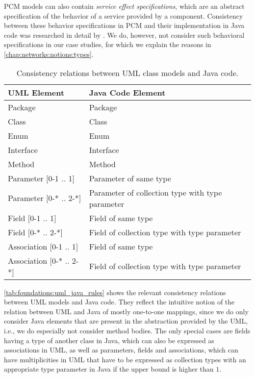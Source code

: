 \gls{PCM} models can also contain \emph{service effect specifications}, which are an abstract specification of the behavior of a service provided by a component.
Consistency between these behavior specifications in \gls{PCM} and their implementation in Java code was researched in detail by \textcite{langhammer2017a}.
We do, however, not consider such behavioral specifications in our case studies, for which we explain the reasons in \autoref{chap:networks:notions:types}.

\begin{table}
	\centering 
    \small
    \renewcommand{\arraystretch}{1.4}
	\begin{tabular}{p{3cm} p{6.8cm}}
		\toprule
        \textbf{\gls{UML} Element}  & \textbf{Java Code Element} \\
        \midrule
        Package                         & Package\\
		Class                           & Class\\
		Enum		                    & Enum \\
		Interface		   	            & Interface \\
        Method                          & Method \\
        Parameter $[$0-1 .. 1$]$        & Parameter of same type \\
        Parameter $[$0-* .. 2-*$]$      & Parameter of collection type with type parameter \\
        Field $[$0-1 .. 1$]$            & Field of same type\\
        Field $[$0-* .. 2-*$]$          & Field of collection type with type parameter\\
        Association $[$0-1 .. 1$]$      & Field of same type\\
        Association $[$0-* .. 2-*$]$    & Field of collection type with type parameter\\
		\bottomrule
	\end{tabular}
	\caption[Consistency relation between UML and Java]{Consistency relations between \gls{UML} class models and Java code.}
	\label{tab:foundations:uml_java_rules}
\end{table}

\autoref{tab:foundations:uml_java_rules} shows the relevant consistency relations between \gls{UML} models and Java code.
They reflect the intuitive notion of the relation between \gls{UML} and Java of mostly one-to-one mappings, since we do only consider Java elements that are present in the abstraction provided by the \gls{UML}, i.e., we do especially not consider method bodies.
The only special cases are fields having a type of another class in Java, which can also be expressed as associations in \gls{UML}, as well as parameters, fields and associations, which can have multiplicities in \gls{UML} that have to be expressed as collection types with an appropriate type parameter in Java if the upper bound is higher than $1$.


